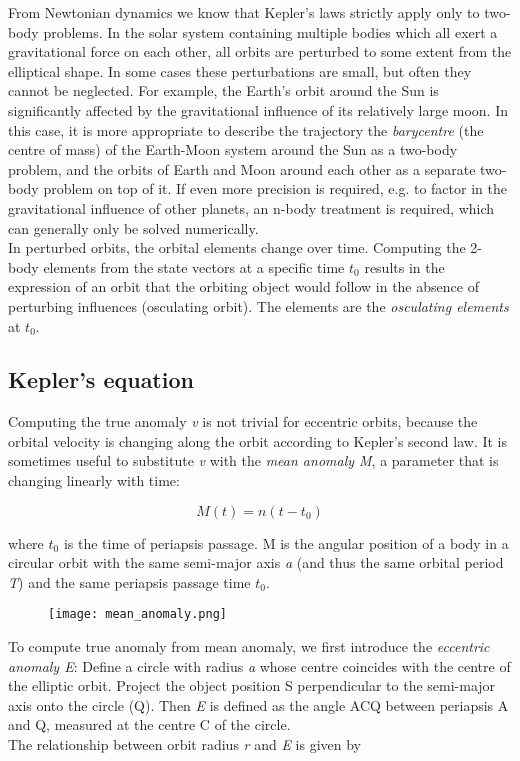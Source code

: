 \documentclass[Orbiter User Manual.tex]{subfiles}
\begin{document}
\noindent
From Newtonian dynamics we know that Kepler's laws strictly apply only to two-body problems. In the solar system containing multiple bodies which all exert a gravitational force on each other, all orbits are perturbed to some extent from the elliptical shape. In some cases these perturbations are small, but often they cannot be neglected. For example, the Earth's orbit around the Sun is significantly affected by the gravitational influence of its relatively large moon. In this case, it is more appropriate to describe the trajectory the \textit{barycentre} (the centre of mass) of the Earth-Moon system around the Sun as a two-body problem, and the orbits of Earth and Moon around each other as a separate two-body problem on top of it. If even more precision is required, e.g. to factor in the gravitational influence of other planets, an n-body treatment is required, which can generally only be solved numerically.\\
In perturbed orbits, the orbital elements change over time. Computing the 2-body elements from the state vectors at a specific time $t_{0}$ results in the expression of an orbit that the orbiting object would follow in the absence of perturbing influences (osculating orbit). The elements are the \textit{osculating elements} at $t_{0}$.

\subsection{Kepler's equation}
Computing the true anomaly \textit{v} is not trivial for eccentric orbits, because the orbital velocity is changing along the orbit according to Kepler's second law. It is sometimes useful to substitute \textit{v} with the \textit{mean anomaly M}, a parameter that is changing linearly with time:

\[ M(t) = n(t - t_{0}) \]

\noindent
where $t_{0}$ is the time of periapsis passage. M is the angular position of a body in a circular orbit with the same semi-major axis \textit{a} (and thus the same orbital period \textit{T}) and the same periapsis passage time $t_{0}$.

\begin{figure}[H]
	\centering
	\texttt{[image: mean\_anomaly.png]}
\end{figure}

\noindent
To compute true anomaly from mean anomaly, we first introduce the \textit{eccentric anomaly E}: Define a circle with radius \textit{a} whose centre coincides with the centre of the elliptic orbit. Project the object position S perpendicular to the semi-major axis onto the circle (Q). Then \textit{E} is defined as the angle ACQ between periapsis A and Q, measured at the centre C of the circle.\\
The relationship between orbit radius \textit{r} and \textit{E} is given by
\end{document}

